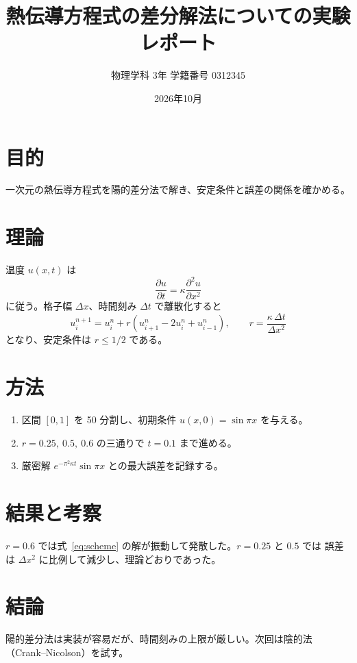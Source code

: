 \documentclass[a4paper,11pt]{ltjsarticle}
\title{熱伝導方程式の差分解法についての実験レポート}
\author{物理学科 3年 \quad 学籍番号 0312345}
\date{2026年10月}
\begin{document}
\maketitle

\section{目的}
一次元の熱伝導方程式を陽的差分法で解き、安定条件と誤差の関係を確かめる。

\section{理論}
温度 $u(x,t)$ は
\begin{equation}
  \frac{\partial u}{\partial t} = \kappa \frac{\partial^2 u}{\partial x^2}
  \label{eq:heat}
\end{equation}
に従う。格子幅 $\Delta x$、時間刻み $\Delta t$ で離散化すると
\begin{equation}
  u_i^{n+1} = u_i^n + r\left(u_{i+1}^n - 2u_i^n + u_{i-1}^n\right),\qquad
  r = \frac{\kappa\,\Delta t}{\Delta x^2}
  \label{eq:scheme}
\end{equation}
となり、安定条件は $r \le 1/2$ である。

\section{方法}
\begin{enumerate}[label=(\arabic*)]
  \item 区間 $[0,1]$ を 50 分割し、初期条件 $u(x,0)=\sin\pi x$ を与える。
  \item $r=0.25,\ 0.5,\ 0.6$ の三通りで $t=0.1$ まで進める。
  \item 厳密解 $e^{-\pi^2\kappa t}\sin\pi x$ との最大誤差を記録する。
\end{enumerate}

\section{結果と考察}
$r=0.6$ では式~\eqref{eq:scheme} の解が振動して発散した。$r=0.25$ と $0.5$ では
誤差は $\Delta x^2$ に比例して減少し、理論どおりであった。

\section{結論}
陽的差分法は実装が容易だが、時間刻みの上限が厳しい。次回は陰的法（Crank--Nicolson）を試す。
\end{document}
